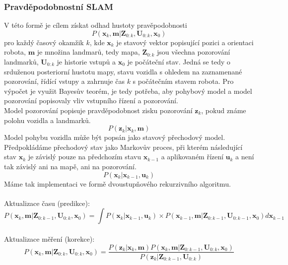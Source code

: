 \documentclass[11pt]{article}
\begin{document}
\subsubsection{Pravděpodobnostní SLAM}
V této formě je cílem získat odhad hustoty pravěpodobnosti
\begin{equation}
	P(\textbf{x}_k,\textbf{m}|\textbf{Z}_{0:k},\textbf{U}_{0:k},\textbf{x}_0)
\end{equation}
pro každý časový okamžik ${k}$, kde $\textbf{x}_k$ je stavový vektor popisující pozici a orientaci robota, $\textbf{m}$ je množina landmarů, tedy mapa, $\textbf{Z}_{0:k}$ jsou všechna pozorování landmarků, $\textbf{U}_{0:k}$ je historie vstupů a $\textbf{x}_0$ je počáteční stav. Jedná se tedy o srduženou posteriorní hustotu mapy, stavu vozidla s ohledem na zaznamenané pozorování, řídící vstupy a zahrnuje čas ${k}$ s počátečním stavem robota. Pro výpočet je využit Bayesův teorém, je tedy potřeba, aby pohybový model a model pozorování popisovaly vliv vstupního řízení a pozorování.\\
\indent Model pozorování popisuje pravděpodobnost zisku pozorování $\textbf{z}_k$, pokud známe polohu vozidla a landmarků.
\begin{equation}
	P(\textbf{z}_k|\textbf{x}_k,\textbf{m})
\end{equation} 
\indent Model pohybu vozidla může být popsán jako stavový přechodový model. \\Předpokládáme přechodový stav jako Markovův proces, při kterém následující stav $\textbf{x}_k$ je závislý pouze na předchozím stavu $\textbf{x}_{k-1}$ a aplikovaném řízení $\textbf{u}_k$ a není tak závislý ani na mapě, ani na pozorování.
\begin{equation}
	P(\textbf{x}_k|\textbf{x}_{k-1},\textbf{u}_k)
\end{equation}
Máme tak implementaci ve formě dvoustupňového rekurzivního algoritmu.\\
\\
Aktualizace času (predikce):
\begin{equation}
	P(\textbf{x}_k,\textbf{m}|\textbf{Z}_{0:k-1},\textbf{U}_{0:k},\textbf{x}_0)=\int P(\textbf{x}_k|\textbf{x}_{k-1},\textbf{u}_k)\times P(\textbf{x}_{k-1},\textbf{m}|\textbf{Z}_{0:k-1},\textbf{U}_{0:k-1},\textbf{x}_0)d\textbf{x}_{k-1}
\end{equation}
\\
Aktualizace měření (korekce):
\begin{equation}
	P(\textbf{x}_k,\textbf{m}|\textbf{Z}_{0:k},\textbf{U}_{0:k},\textbf{x}_0)=\frac{P(\textbf{z}_k|\textbf{x}_k,\textbf{m})P(\textbf{x}_k,\textbf{m}|\textbf{Z}_{0:k-1},\textbf{U}_{0:k},\textbf{x}_0)}{P(\textbf{z}_k|\textbf{Z}_{0:k-1},\textbf{U}_{0:k})}
\end{equation}
\end{document}
